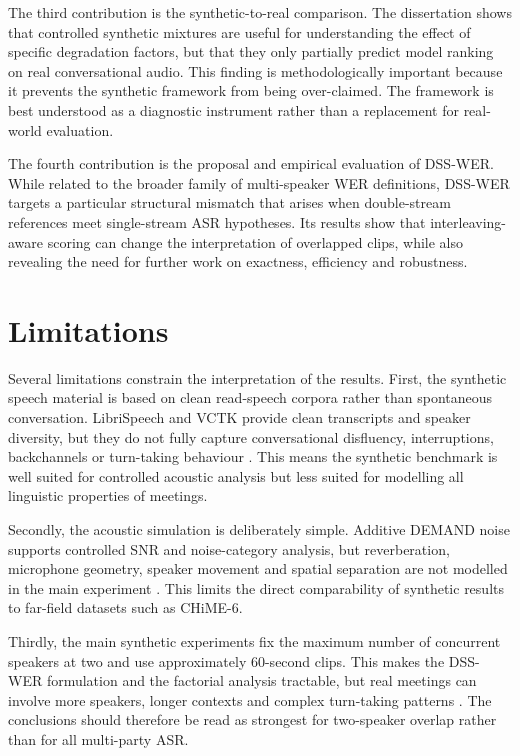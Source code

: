 The third contribution is the synthetic-to-real comparison. The dissertation shows that controlled synthetic mixtures are useful for understanding the effect of specific degradation factors, but that they only partially predict model ranking on real conversational audio. This finding is methodologically important because it prevents the synthetic framework from being over-claimed. The framework is best understood as a diagnostic instrument rather than a replacement for real-world evaluation.

The fourth contribution is the proposal and empirical evaluation of DSS-WER. While related to the broader family of multi-speaker WER definitions, DSS-WER targets a particular structural mismatch that arises when double-stream references meet single-stream ASR hypotheses. Its results show that interleaving-aware scoring can change the interpretation of overlapped clips, while also revealing the need for further work on exactness, efficiency and robustness.

\section{Limitations}
Several limitations constrain the interpretation of the results. First, the synthetic speech material is based on clean read-speech corpora rather than spontaneous conversation. LibriSpeech and VCTK provide clean transcripts and speaker diversity, but they do not fully capture conversational disfluency, interruptions, backchannels or turn-taking behaviour \citep{librispeech, voxceleb, Shriberg2001ObservationsOO}. This means the synthetic benchmark is well suited for controlled acoustic analysis but less suited for modelling all linguistic properties of meetings.

Secondly, the acoustic simulation is deliberately simple. Additive DEMAND noise supports controlled SNR and noise-category analysis, but reverberation, microphone geometry, speaker movement and spatial separation are not modelled in the main experiment \citep{demand, maciejewski2020whamrnoisyreverberantsinglechannel}. This limits the direct comparability of synthetic results to far-field datasets such as CHiME-6.

Thirdly, the main synthetic experiments fix the maximum number of concurrent speakers at two and use approximately 60-second clips. This makes the DSS-WER formulation and the factorial analysis tractable, but real meetings can involve more speakers, longer contexts and complex turn-taking patterns \citep{ami-corpus, chime6, cornell2024chime8dasrchallengegeneralizable}. The conclusions should therefore be read as strongest for two-speaker overlap rather than for all multi-party ASR.

